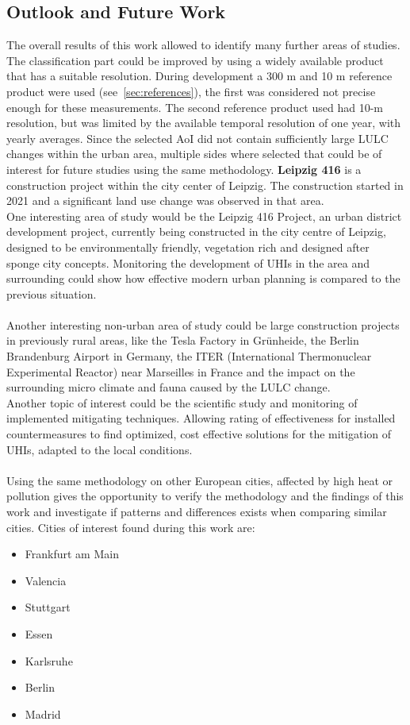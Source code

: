  
\subsection{Outlook and Future Work}\label{sec:future}
The overall results of this work allowed to identify many further areas of studies.
The classification part could be improved by using a widely available product that has a suitable resolution. 
During development a 300 m and 10 m reference product were used (see~\cref{sec:references}), the first was considered not precise enough for these measurements.
The second reference product used had 10-m resolution, but was limited by the available temporal resolution of one year, with yearly averages.
Since the selected \gls{AoI} did not contain sufficiently large \gls{LULC} changes within the urban area, multiple sides where selected that could be of interest for future studies using the same methodology.
\textbf{Leipzig 416} is a construction project within the city center of Leipzig.
The construction started in 2021 and a significant land use change was observed in that area. \\
One interesting area of study would be the Leipzig 416 Project, an urban district development project, currently being constructed in the city centre of Leipzig, designed to be environmentally friendly, vegetation rich and designed after sponge city concepts.
Monitoring the development of \glspl{UHI} in the area and surrounding could show how effective modern urban planning is compared to the previous situation.\\
\\
Another interesting non-urban area of study could be large construction projects in previously rural areas, like the Tesla Factory in Grünheide, the Berlin Brandenburg Airport in Germany, the ITER (International Thermonuclear Experimental Reactor) near Marseilles in France and the impact on the surrounding micro climate and fauna caused by the \gls{LULC} change.
\\
Another topic of interest could be the scientific study and monitoring of implemented mitigating techniques.
Allowing rating of effectiveness for installed countermeasures to find optimized, cost effective solutions for the mitigation of \glspl{UHI}, adapted to the local conditions. \\ \\ 
Using the same methodology on other European cities, affected by high heat or pollution gives the opportunity to verify the methodology and the findings of this work and investigate if patterns and differences exists when comparing similar cities. 
Cities of interest found during this work are: 
\begin{itemize}
  \item Frankfurt am Main
  \item Valencia 
  \item Stuttgart
  \item Essen 
  \item Karlsruhe
  \item Berlin
  \item Madrid 
\end{itemize}

